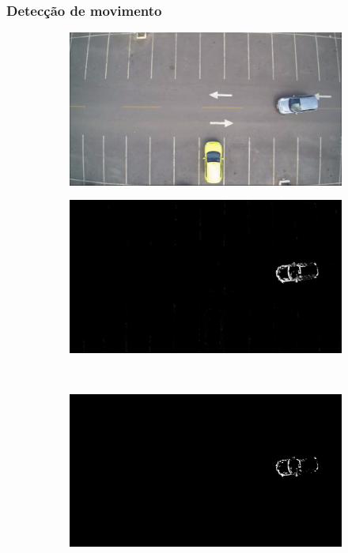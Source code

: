 \documentclass{beamer}
\begin{document}
\begin{frame}
\frametitle{Detecção de movimento}
\begin{figure}
\centering
\begin{subfigure}{.5\textwidth}
  \centering
  \includegraphics[width=.8\linewidth]{quadroMov}
\end{subfigure}%
\begin{subfigure}{.5\textwidth}
  \centering
  \includegraphics[width=.8\linewidth]{mags}
\end{subfigure}\\
\begin{subfigure}{.5\textwidth}
  \centering
  \includegraphics[width=.8\linewidth]{limiarizada}
\end{subfigure}
\centering
\end{figure}
\end{frame}
\end{document}
